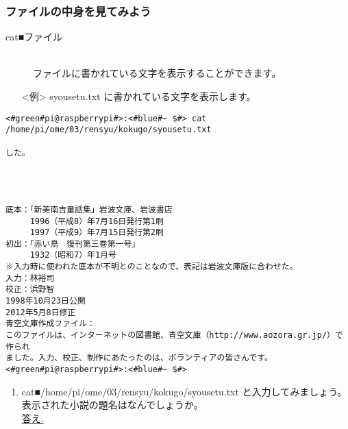 \subsubsection{ファイルの中身を見てみよう}
\begin{description}
\item[cat■ファイル]\mbox{}\\
ファイルに書かれている文字を表示することができます。
\end{description}
\begin{itemize}
\item[<例>]syousetu.txt に書かれている文字を表示します。
\end{itemize}
\begin{lstlisting}[caption=catの例, label=cat]
<#green#pi@raspberrypi#>:<#blue#~ $#> cat /home/pi/ome/03/rensyu/kokugo/syousetu.txt

した。




底本：「新美南吉童話集」岩波文庫、岩波書店
　　　1996（平成8）年7月16日発行第1刷
　　　1997（平成9）年7月15日発行第2刷
初出：「赤い鳥　復刊第三巻第一号」
　　　1932（昭和7）年1月号
※入力時に使われた底本が不明とのことなので、表記は岩波文庫版に合わせた。
入力：林裕司
校正：浜野智
1998年10月23日公開
2012年5月8日修正
青空文庫作成ファイル：
このファイルは、インターネットの図書館、青空文庫（http://www.aozora.gr.jp/）で作られ
ました。入力、校正、制作にあたったのは、ボランティアの皆さんです。<#green#pi@raspberrypi#>:<#blue#~ $#>
\end{lstlisting}

\begin{tcolorbox}[title=\useOmetoi]
\begin{enumerate}
\item cat■/home/pi/ome/03/rensyu/kokugo/syousetu.txt と入力してみましょう。\\表示された小説の題名はなんでしょうか。\\
\underline{答え.\hspace{0.8\linewidth}}
\end{enumerate}
\end{tcolorbox}

